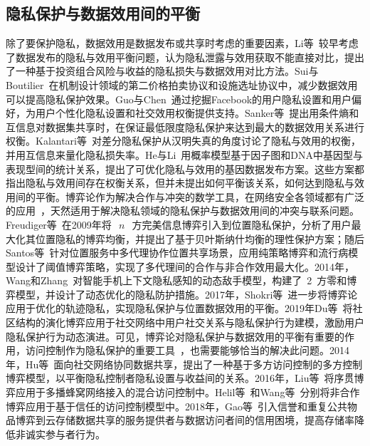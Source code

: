 
\subsection{隐私保护与数据效用间的平衡}
除了要保护隐私，数据效用是数据发布或共享时考虑的重要因素，Li等~\cite{li2009tradeoff}较早考虑了数据发布的隐私与效用平衡问题，认为隐私泄露与效用获取不能直接对比，提出了一种基于投资组合风险与收益的隐私损失与数据效用对比方法。Sui与Boutilier~\cite{sui2011efficiency}在机制设计领域的第二价格拍卖协议和设施选址协议中，减少数据效用可以提高隐私保护效果。Guo与Chen~\cite{guo2012mining}通过挖掘Facebook的用户隐私设置和用户偏好，为用户个性化隐私设置和社交效用权衡提供支持。Sanker等~\cite{sankar2013utility}提出用条件熵和互信息对数据集共享时，在保证最低限度隐私保护来达到最大的数据效用关系进行权衡。Kalantari等~\cite{kalantari2018robust}对差分隐私保护从汉明失真的角度讨论了隐私与效用的权衡，并用互信息来量化隐私损失率。He与Li~\cite{he2019modeling}用概率模型基于因子图和DNA中基因型与表现型间的统计关系，提出了可优化隐私与效用的基因数据发布方案。这些方案都指出隐私与效用间存在权衡关系，但并未提出如何平衡该关系，如何达到隐私与效用间的平衡。博弈论作为解决合作与冲突的数学工具，在网络安全各领域都有广泛的应用~\cite{zhu2018game}，天然适用于解决隐私领域的隐私保护与数据效用间的冲突与联系问题。Freudiger等~\cite{freudiger2009non}在2009年将~$~n~$~方完美信息博弈引入到位置隐私保护，分析了用户最大化其位置隐私的博弈均衡，并提出了基于贝叶斯纳什均衡的理性保护方案；随后Santos等~\cite{santos2011collaborative}针对位置服务中多代理协作位置共享场景，应用纯策略博弈和流行病模型设计了阈值博弈策略，实现了多代理间的合作与非合作效用最大化。2014年，Wang和Zhang~\cite{wang2014stochastic}对智能手机上下文隐私感知的动态敌手模型，构建了~2~方零和博弈模型，并设计了动态优化的隐私防护措施。2017年，Shokri等~\cite{shokri2017privacy}进一步将博弈论应用于优化的轨迹隐私，实现隐私保护与位置数据效用的平衡。2019年Du等~\cite{du2018community}将社区结构的演化博弈应用于社交网络中用户社交关系与隐私保护行为建模，激励用户隐私保护行为动态演进。可见，博弈论对隐私保护与数据效用的平衡有重要的作用，访问控制作为隐私保护的重要工具~\cite{wang2011quantified,nabeel2014privacy,zhang2018privacy}，也需要能够恰当的解决此问题。2014年，Hu等~\cite{hu2014game}面向社交网络协同数据共享，提出了一种基于多方访问控制的多方控制博弈模型，以平衡隐私控制者隐私设置与收益间的关系。2016年，Liu等~\cite{liu2016dynamic}将序贯博弈应用于多播蜂窝网络接入的混合访问控制中。Helil等~\cite{helil2017non}和Wang等~\cite{wang2019game}分别将非合作博弈应用于基于信任的访问控制模型中。2018年，Gao等~\cite{gao2018game}引入信誉和重复公共物品博弈到云存储数据共享的服务提供者与数据访问者间的信用困境，提高存储率降低非诚实参与者行为。

